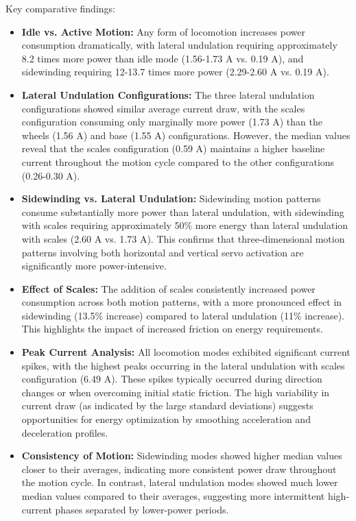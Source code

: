 \documentclass[12pt,a4paper]{report}
\begin{document}
Key comparative findings:
\begin{itemize}
    \item \textbf{Idle vs. Active Motion:} Any form of locomotion increases power consumption dramatically, with lateral undulation requiring approximately 8.2 times more power than idle mode (1.56-1.73 A vs. 0.19 A), and sidewinding requiring 12-13.7 times more power (2.29-2.60 A vs. 0.19 A).
    
    \item \textbf{Lateral Undulation Configurations:} The three lateral undulation configurations showed similar average current draw, with the scales configuration consuming only marginally more power (1.73 A) than the wheels (1.56 A) and base (1.55 A) configurations. However, the median values reveal that the scales configuration (0.59 A) maintains a higher baseline current throughout the motion cycle compared to the other configurations (0.26-0.30 A).
    
    \item \textbf{Sidewinding vs. Lateral Undulation:} Sidewinding motion patterns consume substantially more power than lateral undulation, with sidewinding with scales requiring approximately 50\% more energy than lateral undulation with scales (2.60 A vs. 1.73 A). This confirms that three-dimensional motion patterns involving both horizontal and vertical servo activation are significantly more power-intensive.
    
    \item \textbf{Effect of Scales:} The addition of scales consistently increased power consumption across both motion patterns, with a more pronounced effect in sidewinding (13.5\% increase) compared to lateral undulation (11\% increase). This highlights the impact of increased friction on energy requirements.
    
    \item \textbf{Peak Current Analysis:} All locomotion modes exhibited significant current spikes, with the highest peaks occurring in the lateral undulation with scales configuration (6.49 A). These spikes typically occurred during direction changes or when overcoming initial static friction. The high variability in current draw (as indicated by the large standard deviations) suggests opportunities for energy optimization by smoothing acceleration and deceleration profiles.
    
    \item \textbf{Consistency of Motion:} Sidewinding modes showed higher median values closer to their averages, indicating more consistent power draw throughout the motion cycle. In contrast, lateral undulation modes showed much lower median values compared to their averages, suggesting more intermittent high-current phases separated by lower-power periods.
\end{itemize}
\end{document}
